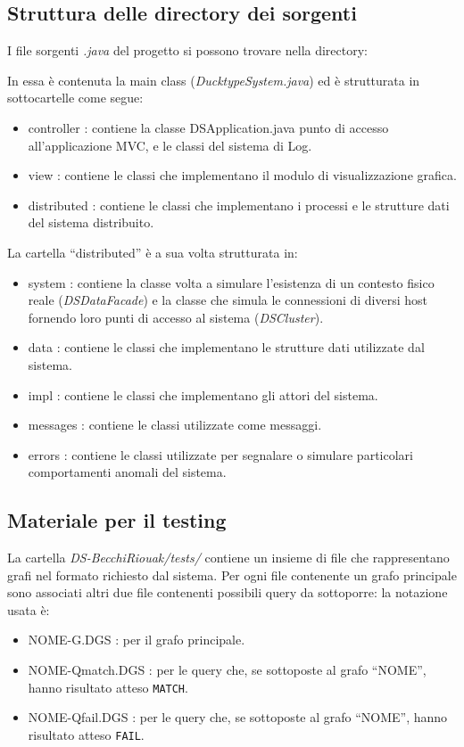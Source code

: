 \subsection{Struttura delle directory dei sorgenti}
I file sorgenti \emph{.java} del progetto si possono trovare nella directory:


In essa è contenuta la main class (\emph{DucktypeSystem.java})
ed è strutturata in sottocartelle come segue:
\begin{itemize}
\item controller : contiene la classe DSApplication.java punto di accesso
  all'applicazione MVC, e le classi del sistema di Log.
\item view : contiene le classi che implementano il modulo di visualizzazione grafica.
\item distributed : contiene le classi che implementano i processi e le strutture
  dati del sistema distribuito.
\end{itemize}

La cartella ``distributed'' è a sua volta strutturata in:
\begin{itemize}
\item system : contiene la classe volta a simulare l'esistenza di un
  contesto fisico reale (\emph{DSDataFacade})
  e la classe che simula le connessioni di diversi host
  fornendo loro punti di accesso al sistema (\emph{DSCluster}).
\item data : contiene le classi che implementano le strutture dati
  utilizzate dal sistema.
\item impl : contiene le classi che implementano gli attori del sistema.
\item messages : contiene le classi utilizzate come messaggi.
\item errors : contiene le classi utilizzate per segnalare o simulare
  particolari comportamenti anomali del sistema.
\end{itemize}

\subsection{Materiale per il testing}
La cartella \emph{DS-BecchiRiouak/tests/} contiene un insieme di file che
rappresentano grafi nel formato richiesto dal sistema.
Per ogni file contenente un grafo principale sono associati
altri due file contenenti possibili query da sottoporre: la notazione
usata è:
\begin{itemize}
\item NOME-G.DGS : per il grafo principale.
\item NOME-Qmatch.DGS : per le query che, se sottoposte al grafo ``NOME'',
  hanno risultato atteso \texttt{MATCH}.
\item NOME-Qfail.DGS : per le query che, se sottoposte al grafo ``NOME'',
  hanno risultato atteso \texttt{FAIL}.
\end{itemize}

